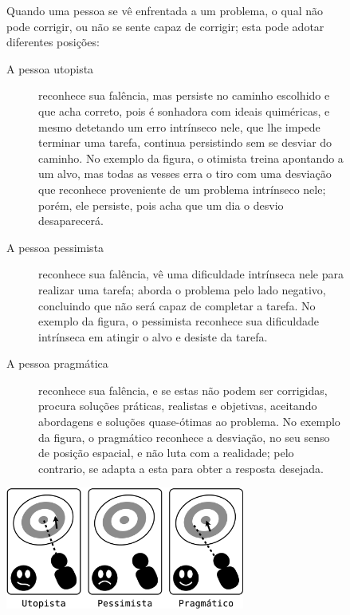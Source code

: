 \begin{figure}[!ht]
\begin{elaboracion}[title=O utopista{,} o pessimista e o pragmático, width= 1.00\linewidth]
Quando uma pessoa se vê enfrentada a um problema, 
o qual não pode corrigir,
ou não se sente capaz de corrigir; esta pode adotar diferentes posições:
\begin{description}
\item[A pessoa utopista] reconhece sua falência, mas persiste no caminho  escolhido
e que acha correto, pois é sonhadora com ideais quiméricas, 
e mesmo detetando um erro intrínseco nele, que lhe impede terminar uma tarefa,
continua persistindo sem se desviar do caminho.
No exemplo da figura, o otimista treina apontando a um alvo, 
mas todas as vesses erra o tiro com uma desviação que reconhece proveniente de um problema intrínseco nele;
porém, ele persiste, pois acha que um dia o desvio desaparecerá.
\item[A pessoa pessimista] reconhece sua falência, 
vê uma dificuldade intrínseca nele para realizar uma tarefa; aborda o problema pelo lado negativo,
concluindo que não será capaz de completar a tarefa.
No exemplo da figura, o pessimista reconhece sua dificuldade intrínseca em atingir o alvo
e desiste da tarefa. 
\item[A pessoa pragmática] reconhece sua falência, e se estas não podem ser corrigidas,
procura soluções práticas, realistas e objetivas, 
aceitando abordagens e soluções quase-ótimas ao problema.
No exemplo da figura, o pragmático reconhece a desviação,
 no seu senso de posição espacial, e não luta com a realidade; pelo contrario, se adapta a esta 
para obter a resposta desejada. 
\end{description}
\begin{center}
    \includegraphics[width=0.7\textwidth]{chapters/cap-body-control/problema-generico-completo.eps}
\end{center}
\end{elaboracion}
\end{figure}

